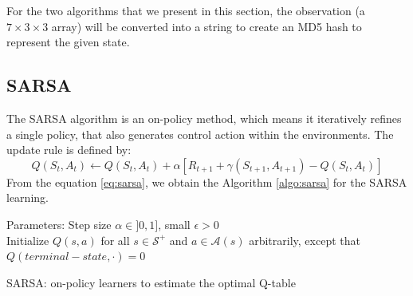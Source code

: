For the two algorithms that we present in this section, the observation (a $7\times3\times3$ array) will be converted into a string to create an MD5 hash to represent the given state.
\subsection{SARSA}
The SARSA algorithm is an on-policy method, which means it iteratively refines a single policy, that also generates control action within the environments. The update rule is defined by:
\begin{equation}\label{eq:sarsa}
	Q(S_t, A_t)\leftarrow Q(S_t, A_t) + \alpha[R_{t+1} + \gamma(S_{t+1}, A_{t+1}) - Q(S_t, A_t)]
\end{equation}
From the equation \eqref{eq:sarsa}, we obtain the Algorithm \ref{algo:sarsa} for the SARSA learning.
\begin{algorithm}
	Parameters: Step size $\alpha\in]0,1]$, small $\epsilon>0$\\
	Initialize $Q(s,a)$ for all $s\in\mathcal{S}^{+}$ and $a\in\mathcal{A}(s)$ arbitrarily, except that $Q(terminal-state, \cdot)=0$\\
	\caption{SARSA: on-policy learners to estimate the optimal Q-table}
	\label{algo:sarsa}
\end{algorithm}

